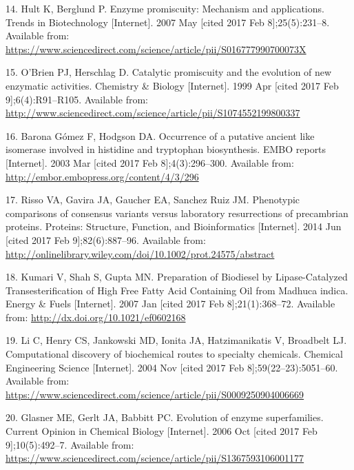 \documentclass[12pt,twoside]{reedthesis}
\begin{document}
  \hypertarget{ref-hult_enzyme_2007}{}
  14. Hult K, Berglund P. Enzyme promiscuity: Mechanism and applications.
  Trends in Biotechnology {[}Internet{]}. 2007 May {[}cited 2017 Feb
  8{]};25(5):231--8. Available from:
  \url{https://www.sciencedirect.com/science/article/pii/S016777990700073X}
  
  \hypertarget{ref-obrien_catalytic_1999}{}
  15. O'Brien PJ, Herschlag D. Catalytic promiscuity and the evolution of
  new enzymatic activities. Chemistry \& Biology {[}Internet{]}. 1999 Apr
  {[}cited 2017 Feb 9{]};6(4):R91--R105. Available from:
  \url{http://www.sciencedirect.com/science/article/pii/S1074552199800337}
  
  \hypertarget{ref-baronagomez_occurrence_2003}{}
  16. Barona Gómez F, Hodgson DA. Occurrence of a putative ancient like
  isomerase involved in histidine and tryptophan biosynthesis. EMBO
  reports {[}Internet{]}. 2003 Mar {[}cited 2017 Feb 8{]};4(3):296--300.
  Available from: \url{http://embor.embopress.org/content/4/3/296}
  
  \hypertarget{ref-risso_phenotypic_2014}{}
  17. Risso VA, Gavira JA, Gaucher EA, Sanchez Ruiz JM. Phenotypic
  comparisons of consensus variants versus laboratory resurrections of
  precambrian proteins. Proteins: Structure, Function, and Bioinformatics
  {[}Internet{]}. 2014 Jun {[}cited 2017 Feb 9{]};82(6):887--96. Available
  from:
  \url{http://onlinelibrary.wiley.com/doi/10.1002/prot.24575/abstract}
  
  \hypertarget{ref-kumari_preparation_2007}{}
  18. Kumari V, Shah S, Gupta MN. Preparation of Biodiesel by
  Lipase-Catalyzed Transesterification of High Free Fatty Acid Containing
  Oil from Madhuca indica. Energy \& Fuels {[}Internet{]}. 2007 Jan
  {[}cited 2017 Feb 8{]};21(1):368--72. Available from:
  \url{http://dx.doi.org/10.1021/ef0602168}
  
  \hypertarget{ref-li_computational_2004}{}
  19. Li C, Henry CS, Jankowski MD, Ionita JA, Hatzimanikatis V, Broadbelt
  LJ. Computational discovery of biochemical routes to specialty
  chemicals. Chemical Engineering Science {[}Internet{]}. 2004 Nov
  {[}cited 2017 Feb 8{]};59(22--23):5051--60. Available from:
  \url{https://www.sciencedirect.com/science/article/pii/S0009250904006669}
  
  \hypertarget{ref-glasner_evolution_2006}{}
  20. Glasner ME, Gerlt JA, Babbitt PC. Evolution of enzyme superfamilies.
  Current Opinion in Chemical Biology {[}Internet{]}. 2006 Oct {[}cited
  2017 Feb 9{]};10(5):492--7. Available from:
  \url{https://www.sciencedirect.com/science/article/pii/S1367593106001177}
  
\end{document}
